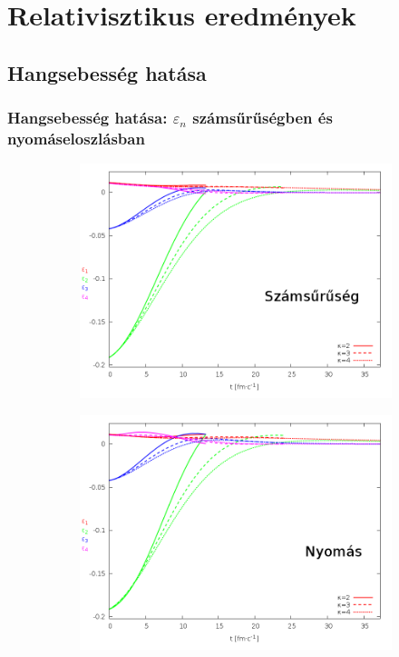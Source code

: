 \documentclass{beamer}
\begin{document}
\section{Relativisztikus eredmények}
\subsection{Hangsebesség hatása}
\begin{frame}[noframenumbering]
\frametitle{Hangsebesség hatása: $\varepsilon_n$ számsűrűségben és nyomáseloszlásban}
\begin{center}
\begin{figure}[H]
	\centering
    \begin{subfigure}[b]{0.49\textwidth}
    		\includegraphics[width=\textwidth]{pic/res/rel/eps_kappa_n}
	\end{subfigure}
	\begin{subfigure}[b]{0.49\textwidth}
        	\includegraphics[width=\textwidth]{pic/res/rel/eps_kappa_p}
	\end{subfigure}
\end{figure}
\end{center}
\end{frame}
\end{document}
